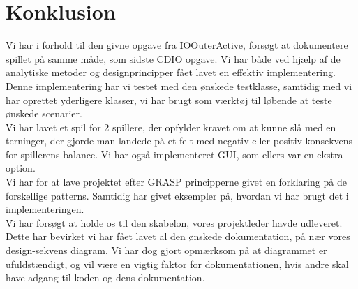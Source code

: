 \section{Konklusion}
Vi har i forhold til den givne opgave fra IOOuterActive, forsøgt at dokumentere spillet på samme måde, som sidste CDIO opgave. Vi har både ved hjælp af de analytiske metoder og designprincipper fået lavet en effektiv implementering. Denne implementering har vi testet med den ønskede testklasse, samtidig med vi har oprettet yderligere klasser, vi har brugt som værktøj til løbende at teste ønskede scenarier.
\\
Vi har lavet et spil for 2 spillere, der opfylder kravet om at kunne slå med en terninger, der gjorde man landede på et felt med negativ eller positiv konsekvens for spillerens balance. Vi har også implementeret GUI, som ellers var en ekstra option.
\\

Vi har for at lave projektet efter GRASP principperne givet en forklaring på de forskellige patterns. Samtidig har givet eksempler på, hvordan vi har brugt det i implementeringen. 
\\

Vi har forsøgt at holde os til den skabelon, vores projektleder havde udleveret. Dette har bevirket vi har fået lavet al den ønskede dokumentation, på nær vores design-sekvens diagram. Vi har dog gjort opmærksom på at diagrammet er ufuldstændigt, og vil være en vigtig faktor for dokumentationen, hvis andre skal have adgang til koden og dens dokumentation.